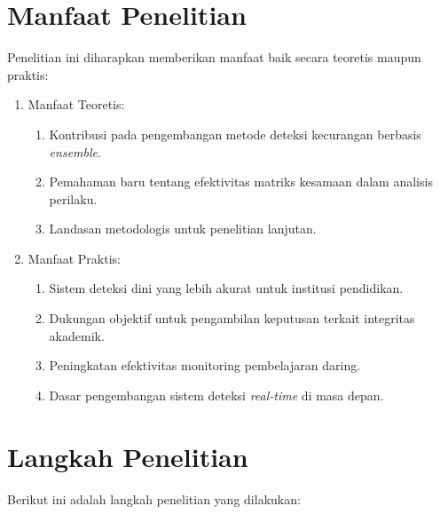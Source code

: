 \section{Manfaat Penelitian}
\label{sec:manfaat}
Penelitian ini diharapkan memberikan manfaat baik secara teoretis maupun praktis:
\begin{enumerate}
    \item Manfaat Teoretis:
    \begin{enumerate}
        \item Kontribusi pada pengembangan metode deteksi kecurangan berbasis \textit{ensemble}.
        \item Pemahaman baru tentang efektivitas matriks kesamaan dalam analisis perilaku.
        \item Landasan metodologis untuk penelitian lanjutan.
    \end{enumerate}
    
    \item Manfaat Praktis:
    \begin{enumerate}
        \item Sistem deteksi dini yang lebih akurat untuk institusi pendidikan.
        \item Dukungan objektif untuk pengambilan keputusan terkait integritas akademik.
        \item Peningkatan efektivitas monitoring pembelajaran daring.
        \item Dasar pengembangan sistem deteksi \textit{real-time} di masa depan.
    \end{enumerate}
\end{enumerate}

\section{Langkah Penelitian}
\label{sec:langkahPenelitian}

Berikut ini adalah langkah penelitian yang dilakukan:

